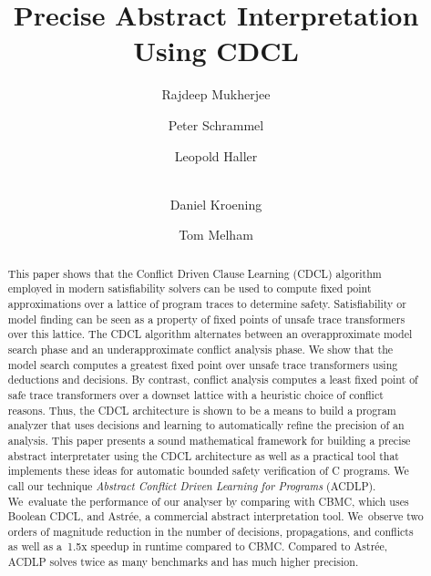 \documentclass{acmsmall}
\begin{document}
\title{Precise Abstract Interpretation Using CDCL}

\author{Rajdeep Mukherjee \and Peter Schrammel \and 
Leopold Haller \and \\ 
Daniel Kroening \and Tom Melham}



\begin{abstract}
%
This paper shows that the Conflict Driven Clause Learning (CDCL) algorithm
employed in modern satisfiability solvers can be used to compute fixed point
approximations over a lattice of program traces to determine safety. 
Satisfiability or model finding can be seen as a property of fixed points of
unsafe trace transformers over this lattice.  The CDCL algorithm alternates
between an overapproximate model search phase and an underapproximate
conflict analysis phase.  We show that the model search computes a greatest
fixed point over unsafe trace transformers using deductions and decisions. 
By contrast, conflict analysis computes a least fixed point of safe trace
transformers over a downset lattice with a heuristic choice of conflict
reasons.  Thus, the CDCL architecture is shown to be a means to build a
program analyzer that uses decisions and learning to automatically refine
the precision of an analysis.  This paper presents a sound mathematical
framework for building a precise abstract interpretater using the CDCL
architecture as well as a practical tool that implements these ideas for
automatic bounded safety verification of C programs.  We call our technique
\emph{Abstract Conflict Driven Learning for Programs} (ACDLP).  We~evaluate
the performance of our analyser by comparing with CBMC, which uses Boolean
CDCL, and Astr{\'e}e, a commercial abstract interpretation tool.  We~observe
two orders of magnitude reduction in the number of decisions, propagations,
and conflicts as well as a~1.5x speedup in runtime compared to CBMC. 
Compared to Astr{\'e}e, ACDLP solves twice as many benchmarks and has much
higher precision.
%
\end{abstract}
\end{document}
